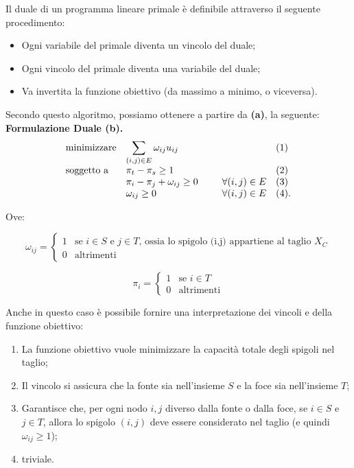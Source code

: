 \documentclass{article}
\begin{document}
Il duale di un programma lineare primale è definibile attraverso il seguente procedimento:
\begin{itemize}
    \item Ogni variabile del primale diventa un vincolo del duale;
    \item Ogni vincolo del primale diventa una variabile del duale;
    \item Va invertita la funzione obiettivo (da massimo a minimo, o viceversa).
\end{itemize} 

Secondo questo algoritmo, possiamo ottenere a partire da \textbf{(a)}, la seguente:
\textbf{Formulazione Duale (b).}
\begin{equation*}
    \begin{array}{ll@{}ll}
    \text{minimizzare}    & \displaystyle\sum_{(i, j) \in E} \omega_{ij}u_{ij} &  &(1)\\
    \text{soggetto a}   & \displaystyle \pi_t - \pi_s \geq 1 &   &(2)\\
                        & \displaystyle \pi_i - \pi_j  + \omega_{ij} \geq 0\;\;\;\;\;\;\;\;\; & \forall (i,j) \in E & (3)\\
                        & \displaystyle \omega_{ij} \geq 0 & \forall (i,j) \in E & (4).\\

    \end{array}
    \end{equation*}

Ove:

\begin{equation}
    \omega_{ij} =
        \begin{cases}
        1 & \text{se $i \in S$ e $j \in T$, ossia lo spigolo (i,j) appartiene al taglio $X_C$}\\
        0 & \text{altrimenti}
        \end{cases}       
\end{equation}

\begin{equation}
    \pi_{i} =
        \begin{cases}
        1 & \text{se $i \in T$}\\
        0 & \text{altrimenti}
        \end{cases}       
\end{equation}

Anche in questo caso è possibile fornire una interpretazione dei vincoli e della funzione obiettivo:
\begin{enumerate}
    \item La funzione obiettivo vuole minimizzare la capacità totale degli spigoli nel taglio;
    \item Il vincolo si assicura che la fonte sia nell'insieme $S$ e la foce sia nell'insieme $T$;
    \item Garantisce che, per ogni nodo $i, j$ diverso dalla fonte o dalla foce, se $i \in S$ e $j \in T$, allora lo spigolo $(i,j)$ deve essere considerato nel taglio
    (e quindi $\omega_{ij}\geq 1$);
    \item triviale.
\end{enumerate}
\end{document}
